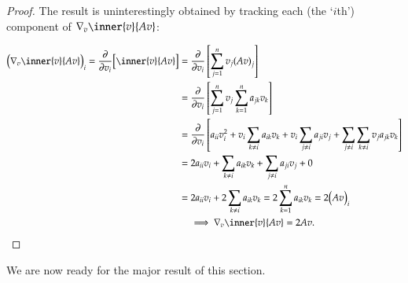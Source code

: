         \begin{proof}
            The result is uninterestingly obtained by tracking
            each (the `$i$th') component of
            $\nabla_{v} \inner{v}{Av}$:
            
            \begin{align}
            {\Big(\nabla_{v} \inner{v}{Av}\Big)}_{i} =
                    \frac{\partial}{\partial v_i} \Big[
                    \inner{v}{Av}\Big]
                    &=  \frac{\partial}{\partial v_i} \left[
                        \sum_{j=1}^{n} v_j {(Av)}_j\right] \\
                    &=	\frac{\partial}{\partial v_i} \left[
                    \sum_{j=1}^{n} v_j \sum_{k=1}^n a_{jk} v_k \right] \\
                    &= \frac{\partial}{\partial v_i} \left[
                    a_{ii} v_i^2 + v_i \sum_{k\ne i} a_{ik} v_k
				                 + v_i \sum_{j\ne i} a_{ji} v_j
				                 + \sum_{j\ne i} \sum_{k \ne i} v_j a_{jk} v_k \right] \\
				    &=  2 a_{ii} v_i + \sum_{k\ne i} a_{ik} v_k
				    + \sum_{j\ne i} a_{ji} v_j + 0 \\
				    &= 2 a_{ii} v_i + 2 \sum_{k\ne i} a_{ik} v_k
				     = 2 \sum_{k=1}^n a_{ik}v_{k} = 2 {\big(Av\big)}_i \\
				     &\quad \implies \nabla_{v} \inner{v}{Av} = 2Av.
            \end{align}
        \end{proof}
        
        We are now ready for the major result of this section.
        
